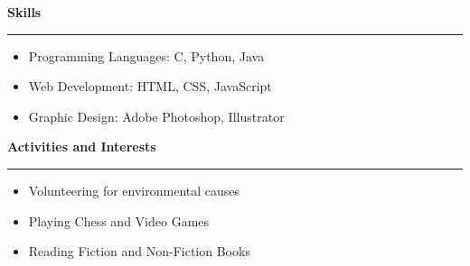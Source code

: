 \documentclass[a4paper,10pt]{article}
\begin{document}
\vspace{4mm}

\noindent \textbf{\large Skills}\\[-1em]
\noindent\rule{\textwidth}{0.4pt}
\begin{itemize}[noitemsep]
  \item Programming Languages: C, Python, Java
  \item Web Development: HTML, CSS, JavaScript
  \item Graphic Design: Adobe Photoshop, Illustrator
\end{itemize}

\vspace{4mm}

\noindent \textbf{\large Activities and Interests}\\[-1em]
\noindent\rule{\textwidth}{0.4pt}
\begin{itemize}[noitemsep]
  \item Volunteering for environmental causes
  \item Playing Chess and Video Games
  \item Reading Fiction and Non-Fiction Books
\end{itemize}
\end{document}
